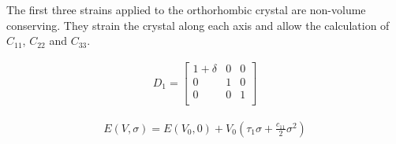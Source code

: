 The first three strains applied to the orthorhombic crystal are non-volume conserving.  They strain the crystal along each axis and allow the calculation of $C_{11}$, $C_{22}$ and $C_{33}$.



\begin{center}
\begin{minipage}{.35\textwidth}
  \begin{equation}
    \begin{split}
      D_{1} = 
      \begin{bmatrix}
      1 + \delta & 0       & 0             \\
      0          & 1       & 0             \\
      0          & 0       & 1             \\
      \end{bmatrix}
    \end{split}
  \label{eq:distortion1}
  \end{equation}
\end{minipage}
\begin{minipage}{.10\textwidth}
\end{minipage}
\begin{minipage}{.54\textwidth}
  \begin{equation}
    \begin{split}
    E(V,\sigma) = E(V_{0},0) + V_{0} \left( \tau_{1} \sigma + \frac{c_{11}}{2} \sigma^2 \right)
    \end{split}
  \label{eq:distortion1energy}
  \end{equation}
\end{minipage}
\end{center}


